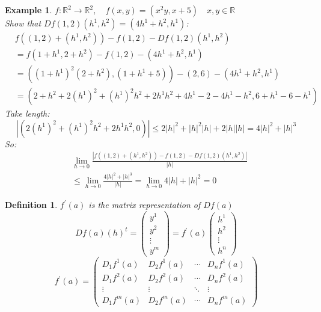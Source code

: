\documentclass[11pt]{article}
\def\RR{\mathbb{R}}
\newtheorem{definition}{Definition}[section]
\newtheorem{example}{Example}[section]
\begin{document}
\begin{example}\label{Df example}
$f:\RR^{2} \rightarrow \RR^{2}, \quad f(x,y)=(x^{2}y,x+5) \quad x,y \in \RR$\\
Show that $Df(1,2)(h^{1}, h^{2})=(4h^{1} +  h^{2}, h^{1})$:
\begin{align*}
&f((1,2) +(h^{1}, h^{2})) - f(1,2) -Df(1,2)(h^{1}, h^{2})\\
&= f(1+h^{1}, 2+ h^{2}) - f(1,2) - (4h^{1}+ h^{2}, h^{1})\\
&=((1+h^{1})^{2}(2+ h^{2}), (1+h^{1} +5)) - (2,6)  - (4h^{1}+ h^{2}, h^{1})\\
&=(2+ h^{2} + 2(h^{1})^{2} +(h^{1})^{2}h^{2} + 2h^{1}h^{2} + 4h^{1} -2 -4h^{1} -h^{2}, 6+h^{1} - 6 -h^{1})
\end{align*}
\textrm{Take length:}
\[|(2(h^{1})^{2} +(h^{1})^{2}h^{2} + 2h^{1}h^{2}, 0)| \leq 2|h|^{2} +|h|^{2}|h| + 2|h||h| = 4|h|^{2} + |h|^{3}\]
\textrm{So:}
\begin{align*}
&\lim_{h \to 0}\frac{|f((1,2) +(h^{1}, h^{2})) - f(1,2) -Df(1,2)(h^{1}, h^{2})|}{|h|}\\
& \leq
\lim_{h \to 0}\frac{4|h|^{2} + |h|^{3}}{|h|} =  \lim_{h \to 0}4|h| + |h|^{2}=0
\end{align*}
\end{example}

\begin{definition}
$f^{'}(a)$ is the matrix representation of $Df(a)$
\[Df(a)(h)^{t}= \left(\! \begin{array}{c} y^{1} \\ y^{2}\\ \vdots\\ y^{m} \end{array}\! \right) = f^{'}(a) \left(\! \begin{array}{c} h^{1} \\ h^{2}\\ \vdots\\ h^{n} \end{array}\! \right) \]
\[ f^{'}(a) = \begin{pmatrix}
  D_{1}f^{1}(a) & D_{2}f^{1}(a) & \cdots &D_{n}f^{1}(a) \\
  D_{1}f^{2}(a) & D_{2}f^{2}(a) & \cdots & D_{n}f^{2}(a) \\
  \vdots  & \vdots  & \ddots & \vdots  \\
  D_{1}f^{m}(a) & D_{2}f^{m}(a) & \cdots & D_{n}f^{m}(a)
 \end{pmatrix}\]
\end{definition}
\end{document}
